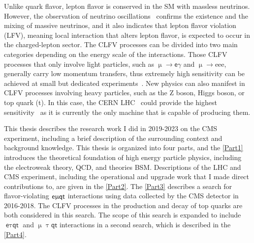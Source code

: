 Unlike quark flavor, lepton flavor is conserved in the \ac{SM} with massless neutrinos. However, the observation of neutrino oscillations~\cite{Super-Kamiokande:1998kpq,SNO:2002tuh} confirms the existence and the mixing of massive neutrinos, and it also indicates that lepton flavor violation (LFV), meaning local interaction that alters lepton flavor, is expected to occur in the charged-lepton sector. The \ac{CLFV} processes can be divided into two main categories depending on the energy scale of the interactions. Those \ac{CLFV} processes that only involve light particles, such as $\upmu\rightarrow\textsf{e}\gamma$ and $\upmu\rightarrow$eee, generally carry low momentum transfers, thus extremely high sensitivity can be achieved at small but dedicated experiments~\cite{MEGII:2018kmf,Mu3e:2020gyw}. New physics can also manifest in \ac{CLFV} processes involving heavy particles, such as the Z boson, Higgs boson, or top quark (t). In this case, the \ac{CERN} \ac{LHC}~\cite{Evans:2008zzb} could provide the highest sensitivity~\cite{Davidson:2012wn} as it is currently the only machine that is capable of producing them.

This thesis describes the research work I did in 2019-2023 on the \ac{CMS} experiment, including a brief description of the surrounding context and background knowledge. This thesis is organized into four parts, and the \autoref{Part1} introduces the theoretical foundation of high energy particle physics, including the electroweak theory, \ac{QCD}, and theories \ac{BSM}. Descriptions of the \ac{LHC} and {CMS} experiment, including the operational and upgrade work that I made direct contributions to, are given in the \autoref{Part2}. The \autoref{Part3} describes a search for flavor-violating $\textsf{e}\upmu\textsf{{q}t}$ interactions using data collected by the \ac{CMS} detector in 2016-2018. The \ac{CLFV} processes in the production and decay of top quarks are both considered in this search. The scope of this search is expanded to include $\textsf{e}\uptau\textsf{qt}$ and $\upmu\uptau\textsf{qt}$ interactions in a second search, which is described in the \autoref{Part4}.




